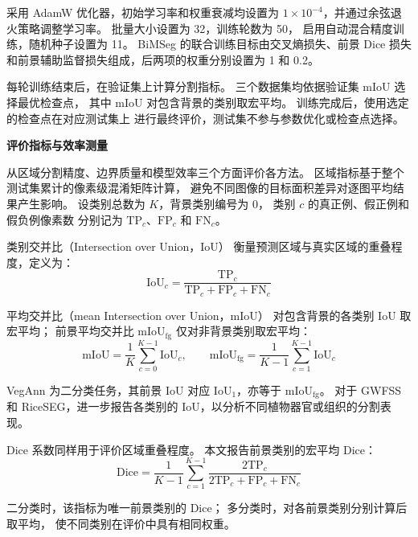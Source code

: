 采用 AdamW 优化器，初始学习率和权重衰减均设置为
\(1\times10^{-4}\)，并通过余弦退火策略调整学习率。
批量大小设置为 32，训练轮数为 50，
启用自动混合精度训练，随机种子设置为 11。
BiMSeg 的联合训练目标由交叉熵损失、前景 Dice 损失
和前景辅助监督损失组成，后两项的权重分别设置为
1 和 0.2。

每轮训练结束后，在验证集上计算分割指标。
三个数据集均依据验证集 mIoU 选择最优检查点，
其中 mIoU 对包含背景的类别取宏平均。
训练完成后，使用选定的检查点在对应测试集上
进行最终评价，测试集不参与参数优化或检查点选择。

\medskip\noindent\textbf{评价指标与效率测量}\par
\label{sec:exp-metrics}

从区域分割精度、边界质量和模型效率三个方面评价各方法。
区域指标基于整个测试集累计的像素级混淆矩阵计算，
避免不同图像的目标面积差异对逐图平均结果产生影响。
设类别总数为 \(K\)，背景类别编号为 0，
类别 \(c\) 的真正例、假正例和假负例像素数
分别记为 \(\mathrm{TP}_c\)、\(\mathrm{FP}_c\)
和 \(\mathrm{FN}_c\)。

类别交并比（Intersection over Union，IoU）
衡量预测区域与真实区域的重叠程度，定义为：
\begin{equation}
\mathrm{IoU}_c=
\frac{\mathrm{TP}_c}
{\mathrm{TP}_c+\mathrm{FP}_c+\mathrm{FN}_c}
\label{eq:exp-class-iou}
\end{equation}

平均交并比（mean Intersection over Union，mIoU）
对包含背景的各类别 IoU 取宏平均；
前景平均交并比 \(\mathrm{mIoU}_{\mathrm{fg}}\)
仅对非背景类别取宏平均：
\begin{equation}
\mathrm{mIoU}=
\frac{1}{K}\sum_{c=0}^{K-1}\mathrm{IoU}_c,
\qquad
\mathrm{mIoU}_{\mathrm{fg}}=
\frac{1}{K-1}\sum_{c=1}^{K-1}\mathrm{IoU}_c
\label{eq:exp-miou}
\end{equation}

VegAnn 为二分类任务，其前景 IoU 对应
\(\mathrm{IoU}_1\)，亦等于
\(\mathrm{mIoU}_{\mathrm{fg}}\)。
对于 GWFSS 和 RiceSEG，进一步报告各类别的
IoU，以分析不同植物器官或组织的分割表现。

Dice 系数同样用于评价区域重叠程度。
本文报告前景类别的宏平均 Dice：
\begin{equation}
\mathrm{Dice}=
\frac{1}{K-1}\sum_{c=1}^{K-1}
\frac{2\mathrm{TP}_c}
{2\mathrm{TP}_c+\mathrm{FP}_c+\mathrm{FN}_c}
\label{eq:exp-dice}
\end{equation}

二分类时，该指标为唯一前景类别的 Dice；
多分类时，对各前景类别分别计算后取平均，
使不同类别在评价中具有相同权重。

